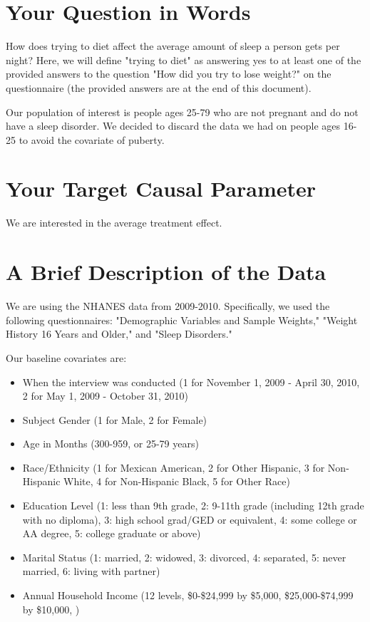 \documentclass{article}
\begin{document}


\section{Your Question in Words}

How does trying to diet affect the average amount of sleep a person gets per night?  Here, we will define "trying to diet" as answering yes to at least one of the provided answers to the question  "How did you try to lose weight?" on the questionnaire (the provided answers are at the end of this document).  

Our population of interest is people ages 25-79 who are not pregnant and do not have a sleep disorder.  We decided to discard the data we had on people ages 16-25 to avoid the covariate of puberty.  

\section{Your Target Causal Parameter}

We are interested in the average treatment effect.  

\section{A Brief Description of the Data}

We are using the NHANES data from 2009-2010.  Specifically, we used the following questionnaires: "Demographic Variables and Sample Weights," "Weight History 16 Years and Older," and "Sleep Disorders."

Our baseline covariates are:
\begin{itemize}
\item When the interview was conducted (1 for November 1, 2009 - April 30, 2010, 2 for May 1, 2009 - October 31, 2010)
\item Subject Gender (1 for Male, 2 for Female)
\item Age in Months (300-959, or 25-79 years)
\item Race/Ethnicity (1 for Mexican American, 2 for Other Hispanic, 3 for Non-Hispanic White, 4 for Non-Hispanic Black, 5 for Other Race)
\item Education Level (1: less than 9th grade, 2: 9-11th grade (including 12th grade with no diploma), 3: high school grad/GED or equivalent, 4: some college or AA degree, 5: college graduate or above)
\item Marital Status (1: married, 2: widowed, 3: divorced, 4: separated, 5: never married, 6: living with partner)
\item Annual Household Income (12 levels, \$0-\$24,999 by \$5,000, \$25,000-\$74,999 by \$10,000, )
\end{itemize}
\end{document}
